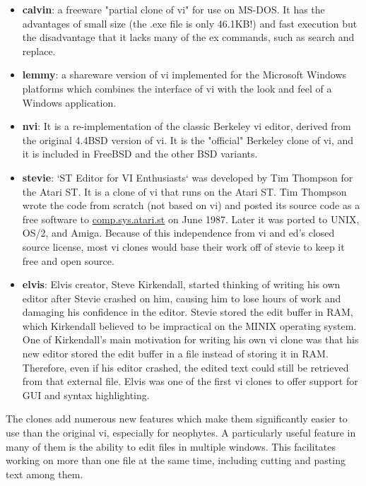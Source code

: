 \begin{itemize}
  \item \textbf{calvin}: a freeware "partial clone of vi" for use on MS-DOS.
 It has the advantages of small size (the .exe file is only 46.1KB!) and fast execution but the disadvantage that it lacks many of the ex commands, such as search and replace.
  \item \textbf{lemmy}: a shareware version of vi implemented for the Microsoft Windows platforms which combines the interface of vi with the look and feel of a Windows application.
  \item \textbf{nvi}: It is a re-implementation of the classic Berkeley vi editor, derived from the original 4.4BSD version of vi.
    It is the "official" Berkeley clone of vi, and it is included in FreeBSD and the other BSD variants.
  \item \textbf{stevie}: `ST Editor for VI Enthusiasts` was developed by Tim Thompson for the Atari ST.
    It is a clone of vi that runs on the Atari ST.
    Tim Thompson wrote the code from scratch (not based on vi) and posted its
    source code as a free software to
    \href{https://groups.google.com/g/comp.sys.atari.st}{comp.sys.atari.st}
    on June 1987. Later it was ported to UNIX, OS/2, and Amiga.
    Because of this independence from vi and ed's closed source license,
    most vi clones would base their work off of stevie to keep it free
    and open source.
  \item \textbf{elvis}:
    Elvis creator, Steve Kirkendall, started thinking of writing his own editor after Stevie crashed on him, causing him to lose hours of work and damaging his confidence in the editor.
Stevie stored the edit buffer in RAM, which Kirkendall believed to be impractical on the MINIX operating system. One of Kirkendall's main motivation for writing his own vi clone was that his new editor stored the edit buffer in a file instead of storing it in RAM. Therefore, even if his editor crashed, the edited text could still be retrieved from that external file.
Elvis was one of the first vi clones to offer support for GUI and syntax highlighting.
\end{itemize}

The clones add numerous new features which make them significantly easier to use than the original vi, especially for neophytes.
A particularly useful feature in many of them is the ability to edit files in multiple windows.
This facilitates working on more than one file at the same time, including cutting and pasting text among them.

